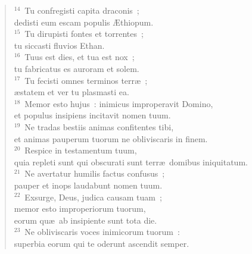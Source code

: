 \begin{flushleft}
\begin{verse}
${}^{14}$~Tu confregisti capita draconis~;\\ dedisti eum escam populis \AE thiopum.\\
${}^{15}$~Tu dirupisti fontes et torrentes~;\\ tu siccasti fluvios Ethan.\\
${}^{16}$~Tuus est dies, et tua est nox~;\\ tu fabricatus es auroram et solem.\\
${}^{17}$~Tu fecisti omnes terminos terr\ae~;\\ \ae statem et ver tu plasmasti ea.\\
${}^{18}$~Memor esto hujus~: inimicus improperavit Domino,\\ et populus insipiens incitavit nomen tuum.\\
${}^{19}$~Ne tradas bestiis animas confitentes tibi,\\ et animas pauperum tuorum ne obliviscaris in finem.\\
${}^{20}$~Respice in testamentum tuum,\\ quia repleti sunt qui obscurati sunt terr\ae\ domibus iniquitatum.\\
${}^{21}$~Ne avertatur humilis factus confusus~;\\ pauper et inops laudabunt nomen tuum.\\
${}^{22}$~Exsurge, Deus, judica causam tuam~;\\ memor esto improperiorum tuorum,\\ eorum qu\ae\ ab insipiente sunt tota die.\\
${}^{23}$~Ne obliviscaris voces inimicorum tuorum~:\\ superbia eorum qui te oderunt ascendit semper.\end{verse}\end{flushleft}


